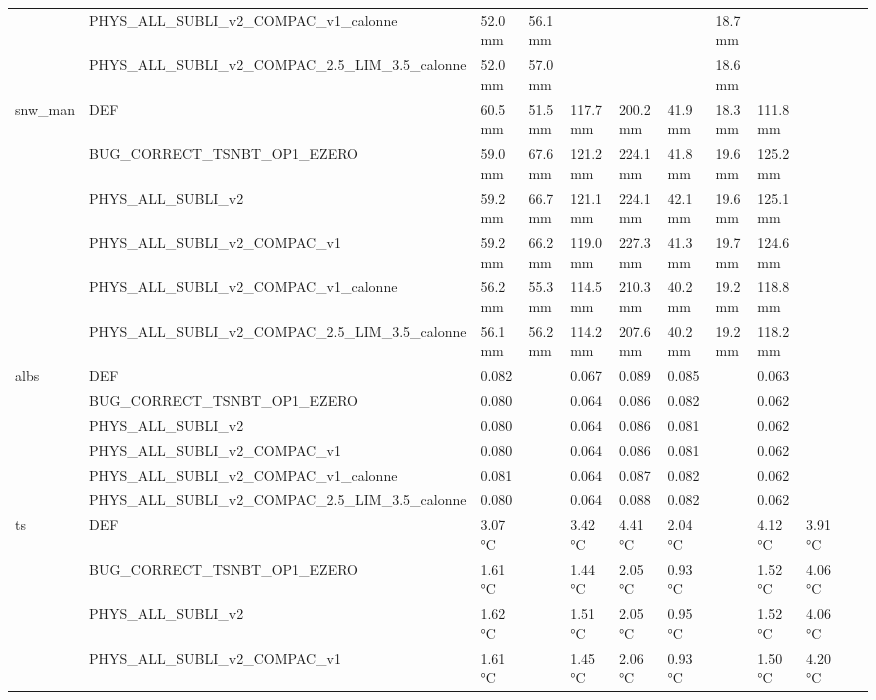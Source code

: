 \begin{tabular}{llllllllllll}
 & PHYS_ALL_SUBLI_v2_COMPAC_v1_calonne & 52.0 mm & 56.1 mm &  &  &  & 18.7 mm &  &  &  &  \\
 & PHYS_ALL_SUBLI_v2_COMPAC_2.5_LIM_3.5_calonne & 52.0 mm & 57.0 mm &  &  &  & 18.6 mm &  &  &  &  \\
\cline{1-12}
\multirow[t]{6}{*}{snw_man} & DEF & 60.5 mm & 51.5 mm & 117.7 mm & 200.2 mm & 41.9 mm & 18.3 mm & 111.8 mm &  &  &  \\
 & BUG_CORRECT_TSNBT_OP1_EZERO & 59.0 mm & 67.6 mm & 121.2 mm & 224.1 mm & 41.8 mm & 19.6 mm & 125.2 mm &  &  &  \\
 & PHYS_ALL_SUBLI_v2 & 59.2 mm & 66.7 mm & 121.1 mm & 224.1 mm & 42.1 mm & 19.6 mm & 125.1 mm &  &  &  \\
 & PHYS_ALL_SUBLI_v2_COMPAC_v1 & 59.2 mm & 66.2 mm & 119.0 mm & 227.3 mm & 41.3 mm & 19.7 mm & 124.6 mm &  &  &  \\
 & PHYS_ALL_SUBLI_v2_COMPAC_v1_calonne & 56.2 mm & 55.3 mm & 114.5 mm & 210.3 mm & 40.2 mm & 19.2 mm & 118.8 mm &  &  &  \\
 & PHYS_ALL_SUBLI_v2_COMPAC_2.5_LIM_3.5_calonne & 56.1 mm & 56.2 mm & 114.2 mm & 207.6 mm & 40.2 mm & 19.2 mm & 118.2 mm &  &  &  \\
\cline{1-12}
\multirow[t]{6}{*}{albs} & DEF & 0.082 &  & 0.067 & 0.089 & 0.085 &  & 0.063 &  &  &  \\
 & BUG_CORRECT_TSNBT_OP1_EZERO & 0.080 &  & 0.064 & 0.086 & 0.082 &  & 0.062 &  &  &  \\
 & PHYS_ALL_SUBLI_v2 & 0.080 &  & 0.064 & 0.086 & 0.081 &  & 0.062 &  &  &  \\
 & PHYS_ALL_SUBLI_v2_COMPAC_v1 & 0.080 &  & 0.064 & 0.086 & 0.081 &  & 0.062 &  &  &  \\
 & PHYS_ALL_SUBLI_v2_COMPAC_v1_calonne & 0.081 &  & 0.064 & 0.087 & 0.082 &  & 0.062 &  &  &  \\
 & PHYS_ALL_SUBLI_v2_COMPAC_2.5_LIM_3.5_calonne & 0.080 &  & 0.064 & 0.088 & 0.082 &  & 0.062 &  &  &  \\
\cline{1-12}
\multirow[t]{6}{*}{ts} & DEF & 3.07 °C &  & 3.42 °C & 4.41 °C & 2.04 °C &  & 4.12 °C & 3.91 °C &  &  \\
 & BUG_CORRECT_TSNBT_OP1_EZERO & 1.61 °C &  & 1.44 °C & 2.05 °C & 0.93 °C &  & 1.52 °C & 4.06 °C &  &  \\
 & PHYS_ALL_SUBLI_v2 & 1.62 °C &  & 1.51 °C & 2.05 °C & 0.95 °C &  & 1.52 °C & 4.06 °C &  &  \\
 & PHYS_ALL_SUBLI_v2_COMPAC_v1 & 1.61 °C &  & 1.45 °C & 2.06 °C & 0.93 °C &  & 1.50 °C & 4.20 °C &  &  \\

\end{tabular}
